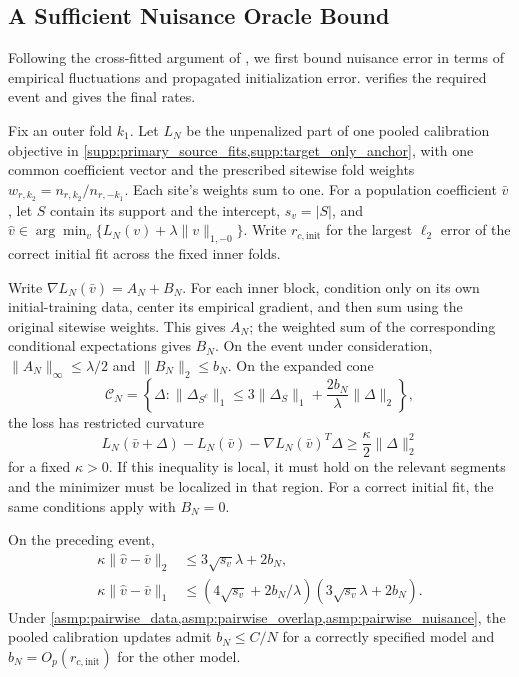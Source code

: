 \documentclass[12pt]{article}
\begin{document}
\subsection{A Sufficient Nuisance Oracle Bound}\label{supp:pairwise_rates}
Following the cross-fitted argument of \citet[Lemma~A21]{hou2025efficient}, we first bound nuisance error in terms of empirical fluctuations and propagated initialization error.  verifies the required event and gives the final rates.

Fix an outer fold $k_1$. Let $L_N$ be the unpenalized part of one pooled calibration objective in \cref{supp:primary_source_fits,supp:target_only_anchor}, with one common coefficient vector and the prescribed sitewise fold weights $w_{r,k_2}=n_{r,k_2}/n_{r,-k_1}$. Each site's weights sum to one. For a population coefficient $\bar v$, let $S$ contain its support and the intercept, $s_v=|S|$, and $\widehat v\in\arg\min_v\{L_N(v)+\lambda\|v\|_{1,-0}\}$. Write $r_{c,\mathrm{init}}$ for the largest $\ell_2$ error of the correct initial fit across the fixed inner folds.

\begin{assumption}\label{asmp:pairwise_penalized_rate}
Write $\nabla L_N(\bar v)=A_N+B_N$. For each inner block, condition only on its own initial-training data, center its empirical gradient, and then sum using the original sitewise weights. This gives $A_N$; the weighted sum of the corresponding conditional expectations gives $B_N$. On the event under consideration, $\|A_N\|_\infty\le\lambda/2$ and $\|B_N\|_2\le b_N$. On the expanded cone
\[
\mathcal C_N=\left\{\Delta:\|\Delta_{S^c}\|_1\le
3\|\Delta_S\|_1+\frac{2b_N}{\lambda}\|\Delta\|_2\right\},
\]
the loss has restricted curvature
\[
L_N(\bar v+\Delta)-L_N(\bar v)-\nabla L_N(\bar v)^T\Delta
\ge\frac\kappa2\|\Delta\|_2^2
\]
for a fixed $\kappa>0$. If this inequality is local, it must hold on the relevant segments and the minimizer must be localized in that region. For a correct initial fit, the same conditions apply with $B_N=0$.
\end{assumption}

\begin{lemma}\label{lem:pairwise_nuisance_rates}
On the preceding event,
\[
\begin{aligned}
\kappa\|\widehat v-\bar v\|_2
&\le3\sqrt{s_v}\lambda+2b_N,\\
\kappa\|\widehat v-\bar v\|_1
&\le(4\sqrt{s_v}+2b_N/\lambda)(3\sqrt{s_v}\lambda+2b_N).
\end{aligned}
\]
Under \cref{asmp:pairwise_data,asmp:pairwise_overlap,asmp:pairwise_nuisance}, the pooled calibration updates admit $b_N\le C/N$ for a correctly specified model and $b_N=O_p(r_{c,\mathrm{init}})$ for the other model.
\end{lemma}
\end{document}
